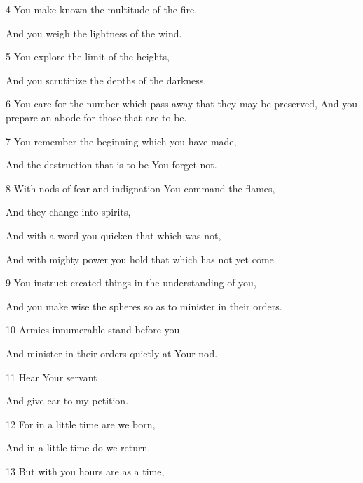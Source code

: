 \par 4 You make known the multitude of the fire,

\par And you weigh the lightness of the wind.

\par 5 You explore the limit of the heights,

\par And you scrutinize the depths of the darkness.

\par 6 You care for the number which pass away that they may be preserved, And you prepare an abode for those that are to be.

\par 7 You remember the beginning which you have made,

\par And the destruction that is to be You forget not.

\par 8 With nods of fear and indignation You command the flames,

\par And they change into spirits,

\par And with a word you quicken that which was not,

\par And with mighty power you hold that which has not yet come.

\par 9 You instruct created things in the understanding of you,

\par And you make wise the spheres so as to minister in their orders.

\par 10 Armies innumerable stand before you

\par And minister in their orders quietly at Your nod.

\par 11 Hear Your servant

\par And give ear to my petition.

\par 12 For in a little time are we born,

\par And in a little time do we return.

\par 13 But with you hours are as a time,

